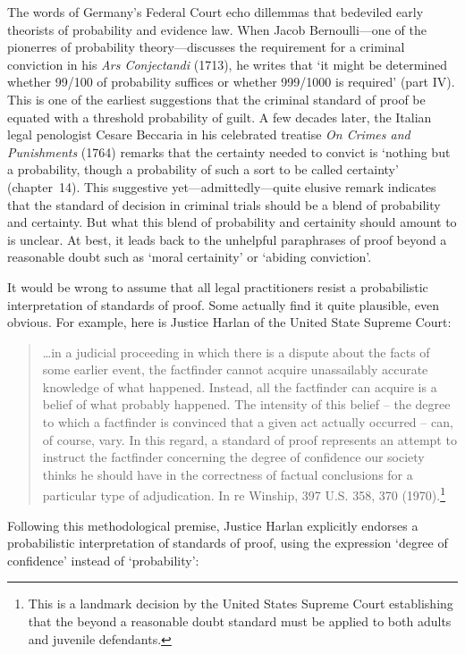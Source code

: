 \documentclass[10pt,dvipsnames,enabledeprecatedfontcommands]{scrartcl}
\begin{document}
The words of Germany's Federal Court echo dillemmas that bedeviled early
theorists of probability and evidence law. When Jacob Bernoulli---one of
the pionerres of probability theory---discusses the requirement for a
criminal conviction in his \textit{Ars Conjectandi} (1713), he writes
that `it might be determined whether 99/100 of probability suffices or
whether 999/1000 is required' (part IV). This is one of the earliest
suggestions that the criminal standard of proof be equated with a
threshold probability of guilt. A few decades later, the Italian legal
penologist Cesare Beccaria in his celebrated treatise
\textit{On Crimes and Punishments} (1764) remarks that the certainty
needed to convict is `nothing but a probability, though a probability of
such a sort to be called certainty' (chapter~14). This suggestive
yet---admittedly---quite elusive remark indicates that the standard of
decision in criminal trials should be a blend of probability and
certainty. But what this blend of probability and certainity should
amount to is unclear. At best, it leads back to the unhelpful
paraphrases of proof beyond a reasonable doubt such as `moral
certainity' or `abiding conviction'.

It would be wrong to assume that all legal practitioners resist a
probabilistic interpretation of standards of proof. Some actually find
it quite plausible, even obvious. For example, here is Justice Harlan of
the United State Supreme Court:

\begin{quote}
\dots in a judicial proceeding in which there is a dispute about the facts of some earlier event, the factfinder cannot acquire unassailably accurate knowledge of what happened. Instead, all the factfinder can acquire is a belief of what probably happened. The intensity of this belief -- the degree to which a factfinder is convinced that a given act actually occurred -- can, of course, vary. In this regard, a standard of proof represents an attempt to instruct the factfinder concerning the degree of confidence our society thinks he should have in the correctness of factual conclusions for a particular type of adjudication. In re Winship, 397 U.S. 358, 370 (1970).\footnote{This is a landmark decision by the United States Supreme Court 
establishing  that the beyond a reasonable doubt standard must be applied to 
both adults and juvenile defendants.}
\end{quote}

Following this methodological premise, Justice Harlan explicitly
endorses a probabilistic interpretation of standards of proof, using the
expression `degree of confidence' instead of `probability':
\end{document}
